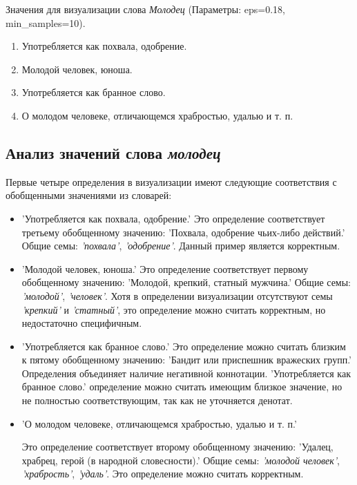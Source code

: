 Значения для визуализации слова \textit{Молодец} (Параметры: eps=0.18, min\_samples=10).

\begin{enumerate}
    \item Употребляется как похвала, одобрение.
    \item Молодой человек, юноша.
    \item Употребляется как бранное слово.
    \item О молодом человеке, отличающемся храбростью, удалью и т. п.
\end{enumerate}

\subsection*{Анализ значений слова \textit{молодец}}

Первые четыре определения в визуализации имеют следующие соответствия с обобщенными значениями из словарей:

\begin{itemize}
    \item ’Употребляется как похвала, одобрение.’
Это определение соответствует третьему обобщенному значению:
’Похвала, одобрение чьих-либо действий.’ Общие семы: \textit{’похвала’}, \textit{’одобрение’}. Данный пример является корректным.

    \item ’Молодой человек, юноша.’
    Это определение соответствует первому обобщенному значению:
    ’Молодой, крепкий, статный мужчина.’
    Общие семы: \textit{’молодой’}, \textit{’человек’}.
    Хотя в определении визуализации отсутствуют семы \textit{’крепкий’} и \textit{’статный’}, это определение можно считать корректным, но недостаточно специфичным.

    \item ’Употребляется как бранное слово.’
    Это определение можно считать близким к пятому обобщенному значению:
    ’Бандит или приспешник вражеских групп.’
    Определения объединяет наличие негативной коннотации.
    ’Употребляется как бранное слово.’ определение можно считать имеющим близкое значение,
но не полностью соответствующим,
так как не уточняется денотат.

    \item ’О молодом человеке, отличающемся храбростью, удалью и т. п.’

    Это определение соответствует второму обобщенному значению:
    ’Удалец, храбрец, герой (в народной словесности).’
    Общие семы: \textit{’молодой человек’}, \textit{’храбрость’}, \textit{’удаль’}.
    Это определение можно считать корректным.

\end{itemize}

